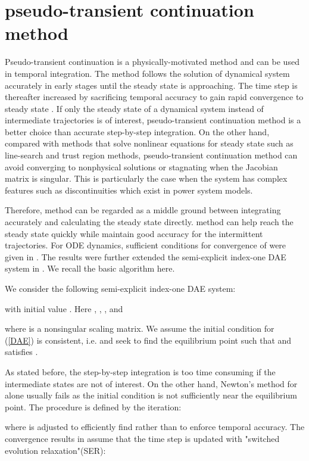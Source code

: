 \documentclass[journal]{IEEEtran}
\begin{document}
\section{pseudo-transient continuation method}\label{sectiondyPTC}
Pseudo-transient continuation is a physically-motivated method and can be used in temporal integration. The method follows the solution of dynamical system accurately in early stages until the steady state is approaching. The time step is thereafter increased by sacrificing temporal accuracy to gain rapid convergence to steady state \cite{Kelley:article}. If only the steady state of a dynamical system instead of intermediate trajectories is of interest, pseudo-transient continuation method is a better choice than accurate step-by-step integration. On the other hand, compared with methods that solve nonlinear equations for steady state such as line-search and trust region methods, pseudo-transient continuation method can avoid converging to nonphysical solutions or stagnating when the Jacobian matrix is singular. This is particularly the case when the system has complex features such as discontinuities which exist in power system models.

Therefore,  method can be regarded as a middle ground between integrating accurately and calculating the steady state directly.  method can help reach the steady state quickly while maintain good accuracy for the intermittent trajectories. For ODE dynamics, sufficient conditions for convergence of  were given in \cite{Kelley:article}. The results were further extended the semi-explicit index-one DAE system in \cite{Kelley:article2}. We recall the basic algorithm here.


We consider the following semi-explicit index-one DAE system:

with initial value . Here , , , and

where  is a nonsingular scaling matrix. We assume the initial condition for (\ref{DAE}) is consistent, i.e.  and seek to find the equilibrium point  such that  and satisfies
.

As stated before, the step-by-step integration is too time consuming if the intermediate states are not of interest. On the other hand, Newton's method for  alone usually fails as the initial condition is not sufficiently near the equilibrium point. 
The  procedure is defined by the iteration:

where  is adjusted to efficiently find  rather than to enforce temporal accuracy. The convergence results in \cite{Kelley:article}\cite{Kelley:article2} assume that the time step is updated with "switched evolution relaxation"(SER):
\end{document}
